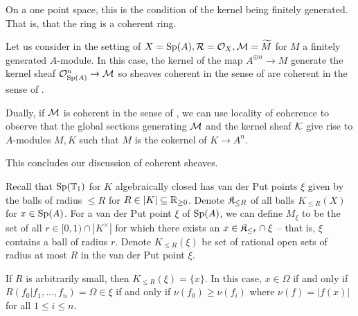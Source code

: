 \begin{remark}
    On a one point space, this is the condition of the kernel being finitely generated. That is, that the ring is a coherent ring. 
\end{remark}
\begin{example}
    Let us consider  in the setting of $X=\mathrm{Sp}(A),\mathcal{R}=\mathcal{O}_{X},\mathcal{M}=\widetilde{M}$ for $M$ a finitely generated $A$-module. In this case, the kernel of the map $A^{\oplus n}\to M$ generate the kernel sheaf $\mathcal{O}_{\mathrm{Sp}(A)}^{n}\to\mathcal{M}$ so sheaves coherent in the sense of  are coherent in the sense of . 

    Dually, if $\mathcal{M}$ is coherent in the sense of , we can use locality of coherence  to observe that the global sections generating $\mathcal{M}$ and the kernel sheaf $\mathcal{K}$ give rise to $A$-modules $M,K$ such that $M$ is the cokernel of $K\to A^{n}$. 
\end{example}
This concludes our discussion of coherent sheaves.

Recall that $\mathrm{Sp}(\mathbb{T}_{1})$ for $K$ algebraically closed has van der Put points $\xi$ given by the balls of radius $\leq R$ for $R\in|K|\subseteq\mathbb{R}_{\geq0}$. Denote $\mathfrak{K}_{\leq R}$ of all balls $K_{\leq R}(X)$ for $x\in\mathrm{Sp}(A)$. For a van der Put point $\xi$ of $\mathrm{Sp}(A)$, we can define $M_{\xi}$ to be the set of all $r\in [0,1)\cap |K^{\times}|$ for which there exists an $x\in\mathfrak{K}_{\leq r}\cap\xi$ -- that is, $\xi$ contains a ball of radius $r$. Denote $K_{\leq R}(\xi)$ be set of rational open sets of radius at most $R$ in the van der Put point $\xi$. 
\begin{example}
    If $R$ is arbitrarily small, then $K_{\leq R}(\xi)=\{x\}$. In this case, $x\in\Omega$ if and only if $R(f_{0}|f_{1},\dots,f_{n})=\Omega\in\xi$ if and only if $\nu(f_{0})\geq\nu(f_{i})$ where $\nu(f)=|f(x)|$ for all $1\leq i\leq n$. 
\end{example}